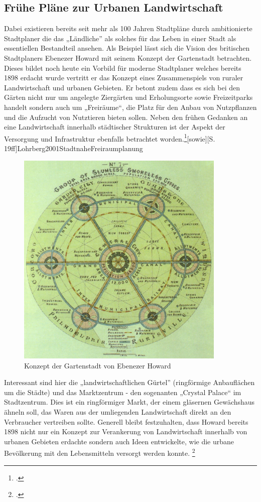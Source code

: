 \documentclass{scrartcl}
\begin{document}
\subsection{Frühe Pläne zur Urbanen Landwirtschaft}
Dabei existieren bereits seit mehr als 100 Jahren Stadtpläne durch ambitionierte Stadtplaner die das „Ländliche” als solches für das Leben in einer Stadt als essentiellen Bestandteil ansehen. Als Beispiel lässt sich die Vision des britischen Stadtplaners Ebenezer Howard mit seinem Konzept der Gartenstadt betrachten. Dieses bildet noch heute ein Vorbild für moderne Stadtplaner welches bereits 1898 erdacht wurde vertritt er das Konzept eines Zusammenspiels von ruraler Landwirtschaft und urbanen Gebieten. Er betont zudem dass es sich bei den Gärten nicht nur um angelegte Ziergärten und Erholungsorte sowie Freizeitparks handelt sondern auch um „Freiräume“, die Platz für den Anbau von Nutzpflanzen und die Aufzucht von Nutztieren bieten sollen. Neben den frühen Gedanken an eine Landwirtschaft innerhalb städtischer Strukturen ist der Aspekt der Versorgung und Infrastruktur ebenfalls betrachtet worden.\footcite[Vgl.][S. 144f]{MullerUrbanStadt}[sowie][S. 19ff]{Lohrberg2001StadtnaheFreiraumplanung}

\begin{figure}[htbp]
\centering
\includegraphics[width=10cm]{image_folder/GardenCityConcept_EbenezerHoward.jpg}
\caption{Konzept der Gartenstadt von Ebenezer Howard}
\label{fig:GardenCityConcept_EbenezerHoward}
\end{figure}

Interessant sind hier die „landwirtschaftlichen Gürtel” (ringförmige Anbauflächen um die Städte) und das Marktzentrum - den sogenanten „Crystal Palace“ im Stadtzentrum. Dies ist ein ringförmiger Markt, der einem gläsernen Gewächshaus ähneln soll, das Waren aus der umliegenden Landwirtschaft direkt an den Verbraucher vertreiben sollte. Generell bleibt festzuhalten, dass Howard bereits 1898 nicht nur ein Konzept zur Verankerung von Landwirtschaft innerhalb von urbanen Gebieten erdachte sondern auch Ideen entwickelte, wie die urbane Bevölkerung mit den Lebensmitteln versorgt werden konnte. \footcite[Vgl.][S. 19ff]{Lohrberg2001StadtnaheFreiraumplanung}
\end{document}
